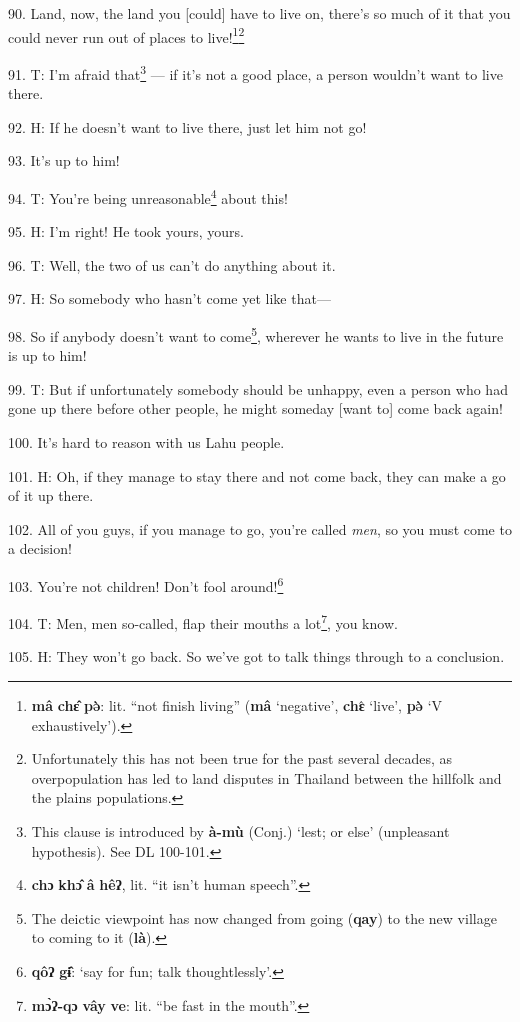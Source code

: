 90. Land, now, the land you [could] have to live on, there's so much of it that
you could never run out of places to live!\footnote{\textbf{mâ} \textbf{chɛ̂} \textbf{pə̀}: lit. ``not finish living'' (\textbf{mâ} `negative', \textbf{chɛ}̂ `live', \textbf{pə̀} `V exhaustively').}\footnote{Unfortunately this has not been true for the past several decades, as overpopulation has led to land disputes in Thailand between the hillfolk and the plains populations.}

91. T: I'm afraid that\footnote{This clause is introduced by \textbf{à-mù} (Conj.) `lest; or else' (unpleasant hypothesis). See DL 100-101.} --- if it's not a good place, a person wouldn't want
to live there.

92. H: If he doesn't want to live there, just let him not go!

93. It's up to him!

94. T: You're being unreasonable\footnote{\textbf{chɔ} \textbf{khɔ̂} \textbf{â} \textbf{hêʔ}, lit. ``it isn't human speech''.} about this!

95. H: I'm right! He took yours, yours.

96. T: Well, the two of us can't do anything about it.

97. H: So somebody who hasn't come yet like that---

98. So if anybody doesn't want to come\footnote{The deictic viewpoint has now changed from going (\textbf{qay}) to the new village to coming to it (\textbf{là}).}, wherever he wants to live in the future
is up to him!

99. T: But if unfortunately somebody should be unhappy, even a person who had gone
up there before other people, he might someday [want to] come back again!

100. It's hard to reason with us Lahu people.

101. H: Oh, if they manage to stay there and not come back, they can make a go
of it up there.

102. All of you guys, if you manage to go, you're called \textit{men}, so you must
come to a decision!

103. You're not children! Don't fool around!\footnote{\textbf{qôʔ} \textbf{gɨ̂}: `say for fun; talk thoughtlessly'.}

104. T: Men, men so-called, flap their mouths a lot\footnote{\textbf{mɔ̀ʔ-qɔ} \textbf{vây} \textbf{ve}: lit. ``be fast in the mouth''.}, you know.

105. H: They won't go back. So we've got to talk things through to a conclusion.

